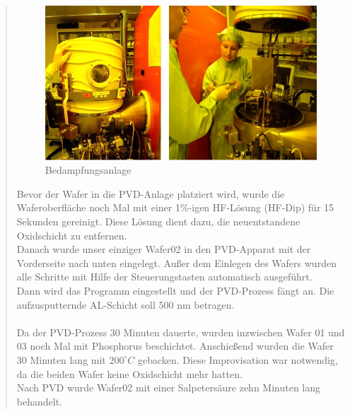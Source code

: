 \begin{quote}
 		\vspace{2em}

    		\begin{figure}[H]
				\hspace{0 cm}
                  \includegraphics[scale=1, trim = 0cm 0cm 0cm 0cm,clip]
                	{./HerstellungBilder/Bedampfungsanlage.png}
                  \caption{Bedampfungsanlage}
                \label{fig:Bedampf}
            \end{figure}

    	\vspace{2em}


		Bevor der Wafer in die PVD-Anlage platziert wird, wurde die
		Waferoberfläche noch Mal mit einer  1\%-igen HF-Lösung (HF-Dip) für 15
		Sekunden gereinigt. Diese Lösung dient dazu, die neuentstandene
		Oxidschicht zu entfernen.\\
		Danach wurde unser einziger Wafer02 in den PVD-Apparat mit der
		Vorderseite nach unten eingelegt. Außer dem Einlegen des Wafers wurden
		alle Schritte mit Hilfe der Steuerungstasten automatisch ausgeführt.\\
		Dann wird das Programm eingestellt und der PVD-Prozess fängt an. Die
		aufzusputternde AL-Schicht soll 500 nm betragen.\\
		\\
		Da der PVD-Prozess 30 Minuten dauerte, wurden inzwischen Wafer 01 und 03
		noch Mal mit Phosphorus beschichtet. Anschießend wurden die Wafer 30
		Minuten lang mit $200^{\circ}C$ gebacken. Diese Improvisation war
		notwendig, da die beiden Wafer keine Oxidschicht mehr hatten.\\
		Nach PVD wurde Wafer02 mit einer Salpetersäure zehn Minuten lang
		behandelt.

		\vspace{2em}


\end{quote}
